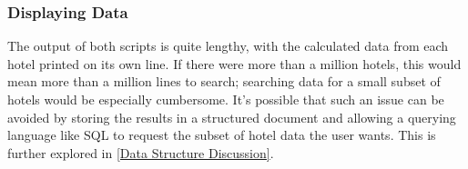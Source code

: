\documentclass{article}
\begin{document}
	\subsubsection{Displaying Data} \label{Display Issue}
	The output of both scripts is quite lengthy, with the calculated data from each hotel printed on its own line. If there were more than a million hotels, this would mean more than a million lines to search; searching data for a small subset of hotels would be especially cumbersome. \newline
	It's possible that such an issue can be avoided by storing the results in a structured document and allowing a querying language like SQL to request the subset of hotel data the user wants. This is further explored in \ref{Data Structure Discussion}. 
	\newline 
	
\end{document}
